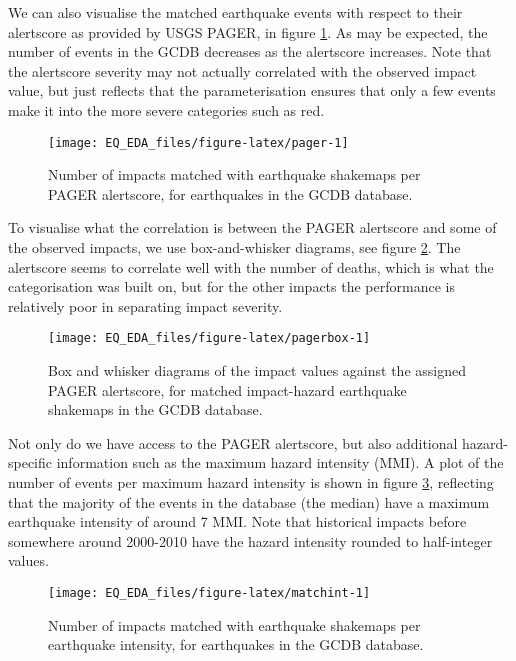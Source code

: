 \documentclass[
]{article}
\begin{document}
We can also visualise the matched earthquake events with respect to their alertscore as provided by USGS PAGER, in figure \ref{fig:pager}. As may be expected, the number of events in the GCDB decreases as the alertscore increases. Note that the alertscore severity may not actually correlated with the observed impact value, but just reflects that the parameterisation ensures that only a few events make it into the more severe categories such as red.

\begin{figure}
\texttt{[image: EQ\_EDA\_files/figure-latex/pager-1]} \caption[Number of impacts matched with earthquake shakemaps per PAGER alertscore, for earthquakes in the GCDB database]{Number of impacts matched with earthquake shakemaps per PAGER alertscore, for earthquakes in the GCDB database.}\label{fig:pager}
\end{figure}

To visualise what the correlation is between the PAGER alertscore and some of the observed impacts, we use box-and-whisker diagrams, see figure \ref{fig:pagerbox}. The alertscore seems to correlate well with the number of deaths, which is what the categorisation was built on, but for the other impacts the performance is relatively poor in separating impact severity.

\begin{figure}
\texttt{[image: EQ\_EDA\_files/figure-latex/pagerbox-1]} \caption[Box and whisker diagrams of the impact values against the assigned PAGER alertscore, for matched impact-hazard earthquake shakemaps in the GCDB database]{Box and whisker diagrams of the impact values against the assigned PAGER alertscore, for matched impact-hazard earthquake shakemaps in the GCDB database.}\label{fig:pagerbox}
\end{figure}

Not only do we have access to the PAGER alertscore, but also additional hazard-specific information such as the maximum hazard intensity (MMI). A plot of the number of events per maximum hazard intensity is shown in figure \ref{fig:matchint}, reflecting that the majority of the events in the database (the median) have a maximum earthquake intensity of around 7 MMI. Note that historical impacts before somewhere around 2000-2010 have the hazard intensity rounded to half-integer values.

\begin{figure}
\texttt{[image: EQ\_EDA\_files/figure-latex/matchint-1]} \caption[Number of impacts matched with earthquake shakemaps per earthquake intensity, for earthquakes in the GCDB database]{Number of impacts matched with earthquake shakemaps per earthquake intensity, for earthquakes in the GCDB database.}\label{fig:matchint}
\end{figure}
\end{document}
